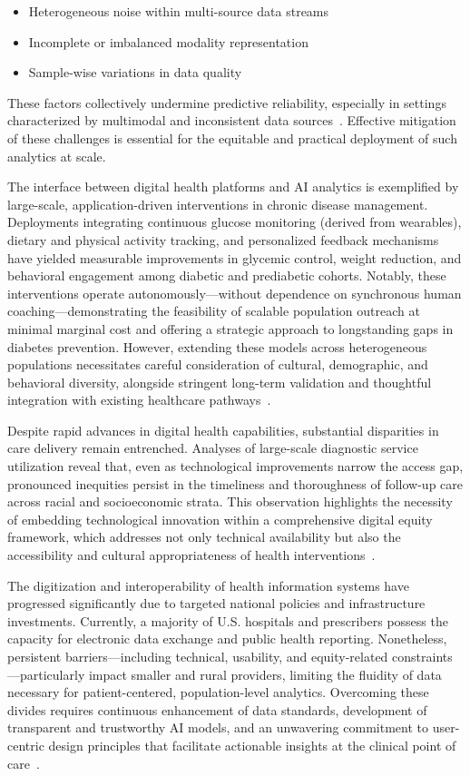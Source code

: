 \begin{itemize}
    \item Heterogeneous noise within multi-source data streams
    \item Incomplete or imbalanced modality representation
    \item Sample-wise variations in data quality
\end{itemize}
These factors collectively undermine predictive reliability, especially in settings characterized by multimodal and inconsistent data sources~\cite{ref78}. Effective mitigation of these challenges is essential for the equitable and practical deployment of such analytics at scale.

The interface between digital health platforms and AI analytics is exemplified by large-scale, application-driven interventions in chronic disease management. Deployments integrating continuous glucose monitoring (derived from wearables), dietary and physical activity tracking, and personalized feedback mechanisms have yielded measurable improvements in glycemic control, weight reduction, and behavioral engagement among diabetic and prediabetic cohorts. Notably, these interventions operate autonomously—without dependence on synchronous human coaching—demonstrating the feasibility of scalable population outreach at minimal marginal cost and offering a strategic approach to longstanding gaps in diabetes prevention. However, extending these models across heterogeneous populations necessitates careful consideration of cultural, demographic, and behavioral diversity, alongside stringent long-term validation and thoughtful integration with existing healthcare pathways~\cite{ref69}.

Despite rapid advances in digital health capabilities, substantial disparities in care delivery remain entrenched. Analyses of large-scale diagnostic service utilization reveal that, even as technological improvements narrow the access gap, pronounced inequities persist in the timeliness and thoroughness of follow-up care across racial and socioeconomic strata. This observation highlights the necessity of embedding technological innovation within a comprehensive digital equity framework, which addresses not only technical availability but also the accessibility and cultural appropriateness of health interventions~\cite{ref85}.

The digitization and interoperability of health information systems have progressed significantly due to targeted national policies and infrastructure investments. Currently, a majority of U.S. hospitals and prescribers possess the capacity for electronic data exchange and public health reporting. Nonetheless, persistent barriers—including technical, usability, and equity-related constraints—particularly impact smaller and rural providers, limiting the fluidity of data necessary for patient-centered, population-level analytics. Overcoming these divides requires continuous enhancement of data standards, development of transparent and trustworthy AI models, and an unwavering commitment to user-centric design principles that facilitate actionable insights at the clinical point of care~\cite{ref82,ref84}.

